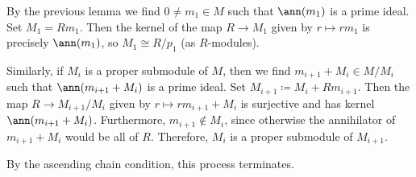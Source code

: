 By the previous lemma we find $0\neq m_1 \in M$ such that
$\ann(m_1)$ is a prime ideal. Set $M_1 = Rm_1$. Then
the kernel of the map $R\to M_1$ given by $r \mapsto rm_1$ is
precisely $\ann(m_1)$, so $M_1\cong R/p_1$ (as $R$-modules).

Similarly, if $M_i$ is a proper submodule of $M$, then we find
$m_{i+1} + M_i \in M/M_i$ such that $\ann(m_{i+1} + M_i)$ is a prime ideal.
Set $M_{i+1} \coloneqq M_i + Rm_{i+1}$. Then the map
$R\to M_{i+1}/M_i$ given by $r\mapsto rm_{i+1}+M_i$ is surjective and has
kernel $\ann(m_{i+1} + M_i)$. Furthermore, $m_{i+1} \notin M_i$, since otherwise
the annihilator of $m_{i+1} + M_i$ would be all of $R$. Therefore,
$M_i$ is a proper submodule of $M_{i+1}$.

By the ascending chain condition, this process terminates.
